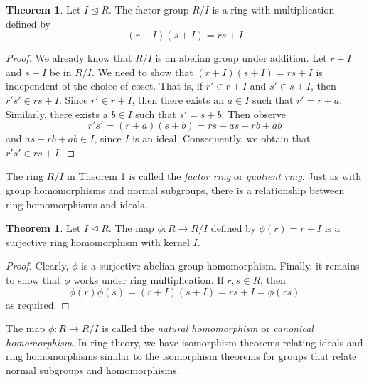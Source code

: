 \documentclass[11pt]{book}
\theoremstyle{definition}\newtheorem{definition}[subsection]{Definition}
\theoremstyle{definition}\newtheorem{example}[subsection]{Example}
\theoremstyle{definition}\newtheorem{notation}[subsection]{Notation}
\theoremstyle{definition}\newtheorem{remark}[subsection]{Remark}
\theoremstyle{theorem}\newtheorem{theorem}[subsection]{Theorem}
\theoremstyle{theorem}\newtheorem{lemma}[subsection]{Lemma}
\theoremstyle{theorem}\newtheorem{proposition}[subsection]{Proposition}
\theoremstyle{theorem}\newtheorem{corollary}[subsection]{Corollary}
\newcommand{\teq}{\trianglelefteq}
\begin{document}
\begin{theorem}\label{theorem:1.3.13}
    Let $I \teq R$. The factor group $R/I$ is a ring with multiplication defined by
    \begin{equation*}
        (r + I)(s + I) = rs + I
    \end{equation*}
\end{theorem} 

\begin{proof}
    We already know that $R/I$ is an abelian group under addition. Let $r + I$ and $s + I$ be in $R/I$. We need to show that $(r + I)(s + I) = rs + I$ is independent of the choice of coset. That is, if $r' \in r + I$ and $s' \in s + I$, then $r's' \in rs + I$. Since $r' \in r + I$, then there exists an $a \in I$ such that $r' = r + a$. Similarly, there exists a $b \in I$ such that $s' = s + b$. Then observe
    \begin{equation*}
        r's' = (r + a)(s + b) = rs + as + rb + ab
    \end{equation*} 
    and $as + rb + ab \in I$, since $I$ is an ideal. Consequently, we obtain that $r's' \in rs + I$.
\end{proof}

The ring $R/I$ in Theorem \ref{theorem:1.3.13} is called the \emph{factor ring} or \emph{quotient ring}. Just as with group homomorphisms and normal subgroups, there is a relationship between ring homomorphisms and ideals.  

\begin{theorem}\label{theorem:1.3.14}
    Let $I \teq R$. The map $\phi : R \to R/I$ defined by $\phi(r) = r + I$ is a surjective ring homomorphism with kernel $I$.
\end{theorem}

\begin{proof}
    Clearly, $\phi$ is a surjective abelian group homomorphism. Finally, it remains to show that $\phi$ works under ring multiplication. If $r, s \in R$, then
    \begin{equation*}
        \phi(r)\phi(s) = (r + I)(s + I) = rs + I = \phi(rs)
    \end{equation*}
    as required.
\end{proof}

The map $\phi : R \to R/I$ is called the \emph{natural homomorphism} or \emph{canonical homomorphism}. In ring theory, we have isomorphism theorems relating ideals and ring homomorphisms similar to the isomorphism theorems for groups that relate normal subgroups and homomorphisms. 
\end{document}
